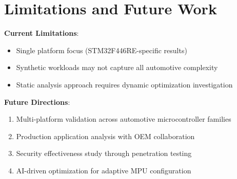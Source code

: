 \section{Limitations and Future Work}

\textbf{Current Limitations}:
\begin{itemize}
    \item Single platform focus (STM32F446RE-specific results)
    \item Synthetic workloads may not capture all automotive complexity
    \item Static analysis approach requires dynamic optimization investigation
\end{itemize}

\textbf{Future Directions}:
\begin{enumerate}
    \item Multi-platform validation across automotive microcontroller families
    \item Production application analysis with OEM collaboration
    \item Security effectiveness study through penetration testing
    \item AI-driven optimization for adaptive MPU configuration
\end{enumerate}